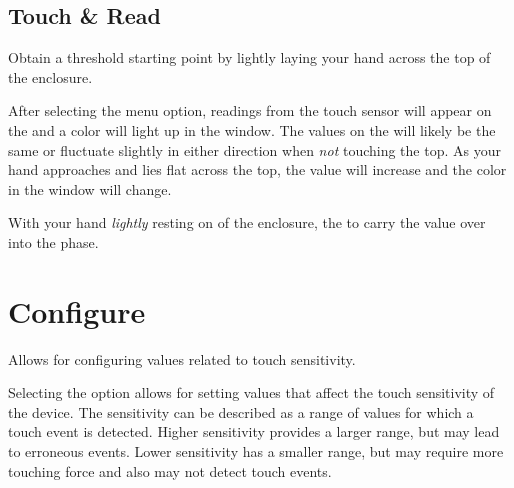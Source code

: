 \subsection{Touch \& Read} 

Obtain a threshold starting point by lightly laying your hand across the top of
the enclosure.

\par\medskip

After selecting the  menu option, readings from the touch sensor will
appear on the  and a color will light up in the  window.  The
values on the  will likely be the same or fluctuate slightly in either
direction when \textit{not} touching the top.  As your hand approaches and lies
flat across the top, the value will increase and the color in the 
window will change.

\par\medskip

With your hand \textit{lightly} resting on  of the enclosure,  the
 to carry the value over into the \hyperref[Test and Adjust]{}
phase.


\section{Configure} \label{Touch Configuration} 

Allows for configuring values related to touch sensitivity.

\par\medskip

Selecting the  option allows for setting values that affect the touch
sensitivity of the device.  The sensitivity can be described as a range of
values for which a touch event is detected.  Higher sensitivity provides a
larger range, but may lead to erroneous events.  Lower sensitivity has a smaller
range, but may require more touching force and also may not detect touch events.

